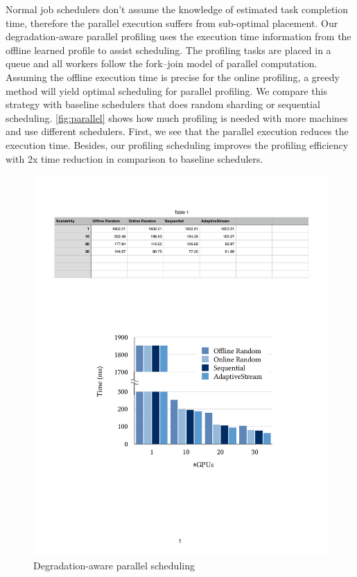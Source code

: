  Normal job schedulers don't assume
the knowledge of estimated task completion time, therefore the parallel
execution suffers from sub-optimal placement. Our degradation-aware parallel
profiling uses the execution time information from the offline learned profile
to assist scheduling. The profiling tasks are placed in a queue and all workers
follow the fork–join model of parallel computation. Assuming the offline
execution time is precise for the online profiling, a greedy method will yield
optimal scheduling for parallel profiling. We compare this strategy with
baseline schedulers that does random sharding or sequential scheduling.
\autoref{fig:parallel} shows how much profiling is needed with more machines and
use different schedulers. First, we see that the parallel execution reduces the
execution time. Besides, our profiling scheduling improves the profiling
efficiency with 2x time reduction in comparison to baseline schedulers.

\begin{figure}
  \centering
  \includegraphics[width=0.9\columnwidth]{figures/parallel-placeholder.pdf}
  \caption{Degradation-aware parallel scheduling}
  \label{fig:parallel}
\end{figure}

